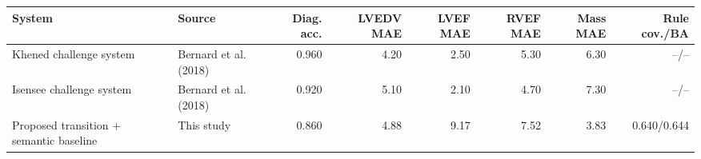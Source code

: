 \setcounter{table}{7}\label{tab:acdc_sota_comparison}
\begin{tabular}{llrrrrrr}
\toprule
System & Source & Diag. acc. & LVEDV MAE & LVEF MAE & RVEF MAE & Mass MAE & Rule cov./BA \\
\midrule
Khened challenge system & Bernard et al. (2018) & 0.960 & 4.20 & 2.50 & 5.30 & 6.30 & --/-- \\
Isensee challenge system & Bernard et al. (2018) & 0.920 & 5.10 & 2.10 & 4.70 & 7.30 & --/-- \\
Proposed transition + semantic baseline & This study & 0.860 & 4.88 & 9.17 & 7.52 & 3.83 & 0.640/0.644 \\
\bottomrule
\end{tabular}
